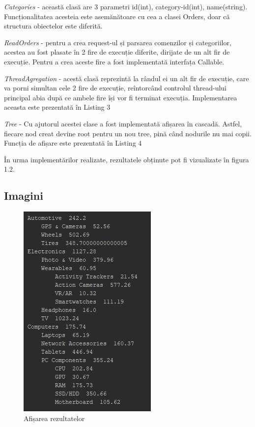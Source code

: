 \textit{Categories} - această clasă are 3 parametri id(int), category-id(int), name(string). Funcționalitatea acesteia este asemănătoare cu cea a clasei Orders, doar că structura obiectelor este diferită.

\textit{ReadOrders} - pentru a crea request-ul și parsarea comenzilor și categoriilor, acestea au fost plasate în 2 fire de execuție diferite, dirijate de un alt fir de execuție. Pentru a crea aceste fire a fost implementată interfața Callable.

\textit{ThreadAgregation} - acestă clasă reprezintă la rândul ei un alt fir de execuție, care va porni simultan cele 2 fire de execuție, reîntorcând controlul thread-ului principal abia după ce ambele fire își vor fi terminat execuția. Implementarea aceasta este prezentată în Listing 3

\textit{Tree} - Cu ajutorul acestei clase a fost implementată afișarea în cascadă. Astfel, fiecare nod creat devine root pentru un nou tree, pină când nodurile nu mai copii. Funcția de afișare este prezentată în Listing 4

În urma implementărilor realizate, rezultatele obținute pot fi vizualizate în figura 1.2.
\subsection{Imagini}










\begin{figure}[!ht]
	\centering
	\includegraphics[width=0.5\linewidth]{1}
	\caption{Afișarea rezultatelor}
	\label{fig:1}
\end{figure}


\clearpage